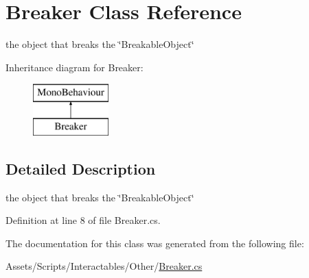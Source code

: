 \hypertarget{class_breaker}{}\section{Breaker Class Reference}
\label{class_breaker}


the object that breaks the \char`\"{}\+Breakable\+Object\char`\"{}  


Inheritance diagram for Breaker\+:\begin{figure}[H]
\begin{center}
\leavevmode
\includegraphics[height=2.000000cm]{class_breaker}
\end{center}
\end{figure}


\subsection{Detailed Description}
the object that breaks the \char`\"{}\+Breakable\+Object\char`\"{} 



Definition at line 8 of file Breaker.\+cs.



The documentation for this class was generated from the following file\+:\begin{DoxyCompactItemize}
\item 
Assets/\+Scripts/\+Interactables/\+Other/\mbox{\hyperlink{_breaker_8cs}{Breaker.\+cs}}\end{DoxyCompactItemize}
